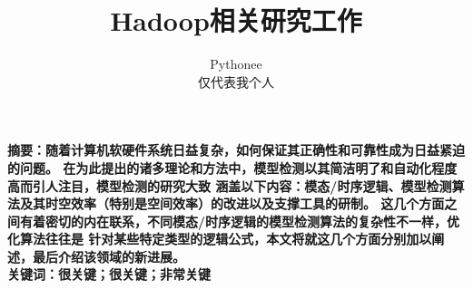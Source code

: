 \documentclass{ctexart}
\begin{document}
\title{\bfseries{Hadoop相关研究工作}}
\author{{Pythonee}\\[8pt]
 仅代表我个人 \\[4pt]
}
\date{}  %

\maketitle
\pagestyle{plain}
\thispagestyle{empty}
\vspace{-20pt}


\begin{center}
\parbox{\textwidth}{
\bfseries{摘要：}\rm{随着计算机软硬件系统日益复杂，如何保证其正确性和可靠性成为日益紧迫的问题。
在为此提出的诸多理论和方法中，模型检测以其简洁明了和自动化程度高而引人注目，模型检测的研究大致
涵盖以下内容：模态/时序逻辑、模型检测算法及其时空效率（特别是空间效率）的改进以及支撑工具的研制。
这几个方面之间有着密切的内在联系，不同模态/时序逻辑的模型检测算法的复杂性不一样，优化算法往往是
针对某些特定类型的逻辑公式，本文将就这几个方面分别加以阐述，最后介绍该领域的新进展。}\\[5pt]
\bfseries{关键词：}\rm{很关键；很关键；非常关键}
\\[5pt]
}
\end{center}

\begin{comment}
\begin{center}
\zihao{4}{\textbf{Understanding counterexamples using Craig Interpolation}}\\[7pt]
\normalsize
Wang Fei\\[7pt]
\zihao{-5} College of Computer Science and Technology\\
Harbin Engineering University, Heilongjiang Harbin 150001\\[10pt]
\end{center}
\begin{center}
\parbox{\textwidth}{
\textbf{Abstract:} Model checking is an automatic technique for verifying finite-state reactive systems, such as sequential circuit designs and communication protocols. Specifications are expressed in temporal logic, and the reactive system is modeled as a state-transition graph. An efficient search procedure is used to determine whether or not the state-transition graph satisfies the specifications.
We describe the basic model checking algorithm and show how it can be used with binary decision diagrams to verify properties of large state-transition graphs. We illustrate the power of model checking to find subtle errors by verifying part of the Contingency Guidance Requirements for the Space Shuttle.\\[4pt]
\textbf{Keywords:} Key; Key; the Key
}
\end{center}
\end{comment}
\end{document}
